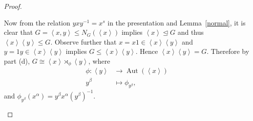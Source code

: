 \documentclass[10pt]{amsart}
\newcommand{\Aut}[1]{\operatorname{Aut}\left(#1\right)}
\begin{document}
\begin{thm}
\begin{proof}
\begin{enumerate}[(a)]
      Now from the relation $yxy^{-1} = x^s$ in the presentation and Lemma~\ref{normal}, it is clear that $G = \left<x, y\right> \leq N_G(\left<x\right>)$ implies $\left<x\right> \unlhd G$ and thus $\left<x\right>\left<y\right> \leq G$.
      Observe further that $x = x1 \in \left<x\right>\left<y\right>$ and $y = 1y \in \left<x\right>\left<y\right>$ implies $G \leq \left<x\right>\left<y\right>$.
      Hence $\left<x\right>\left<y\right> = G$.
      Therefore by part (d), $G \cong \left<x\right> \rtimes_{\phi} \left<y\right>$, where 
      \begin{align*}
        \phi \colon \left<y\right> &\rightarrow \Aut{\left<x\right>}\\
        y^\beta &\mapsto \phi_{y^\beta},
      \end{align*} 
      and $\phi_{y^\beta}(x^\alpha) = y^\beta x^\alpha (y^\beta)^{-1}$.
    \end{enumerate}
  \end{proof}
\end{thm}
\end{document}

